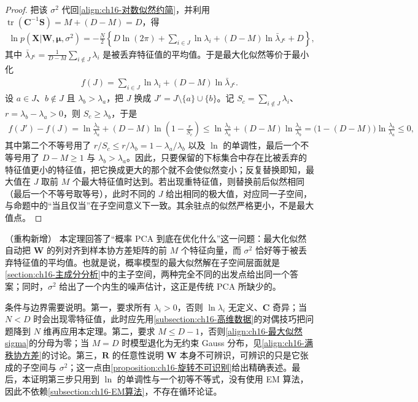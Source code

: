 \documentclass[../../main.tex]{subfiles}
\begin{document}
\begin{proof}
把该 $\sigma^2$ 代回\eqref{align:ch16-对数似然约简}，并利用 $\operatorname{tr}(\bm{C}^{-1}\bm{S})=M+(D-M)=D$，得
\begin{align*}
  \ln p(\bm{X}|\bm{W},\bm{\mu},\sigma^2)=-\frac{N}{2}\left\{D\ln(2\pi)+\sum_{i\in J}\ln\lambda_i+(D-M)\ln\bar{\lambda}_{J^{\mathsf c}}+D\right\},
\end{align*}
其中 $\bar{\lambda}_{J^{\mathsf c}}=\frac{1}{D-M}\sum_{i\notin J}\lambda_i$ 是被丢弃特征值的平均值。于是最大化似然等价于最小化
\begin{align*}
  f(J)=\sum_{i\in J}\ln\lambda_i+(D-M)\ln\bar{\lambda}_{J^{\mathsf c}}.
\end{align*}
设 $a\in J$、$b\notin J$ 且 $\lambda_b>\lambda_a$，把 $J$ 换成 $J'=J\setminus\{a\}\cup\{b\}$。记 $S_c=\sum_{i\notin J}\lambda_i$、$r=\lambda_b-\lambda_a>0$，则 $S_c\geqslant\lambda_b$，于是
\begin{align*}
  f(J')-f(J)=\ln\frac{\lambda_b}{\lambda_a}+(D-M)\ln\left(1-\frac{r}{S_c}\right)
  \leqslant\ln\frac{\lambda_b}{\lambda_a}+(D-M)\ln\frac{\lambda_a}{\lambda_b}
  =\bigl(1-(D-M)\bigr)\ln\frac{\lambda_b}{\lambda_a}\leqslant0,
\end{align*}
其中第二个不等号用了 $r/S_c\leqslant r/\lambda_b=1-\lambda_a/\lambda_b$ 以及 $\ln$ 的单调性，最后一个不等号用了 $D-M\geqslant1$ 与 $\lambda_b>\lambda_a$。因此，只要保留的下标集合中存在比被丢弃的特征值更小的特征值，把它换成更大的那个就不会使似然变小；反复替换即知，最大值在 $J$ 取前 $M$ 个最大特征值时达到。若出现重特征值，则替换前后似然相同（最后一个不等号取等号），此时不同的 $J$ 给出相同的极大值，对应同一子空间，与命题中的“当且仅当”在子空间意义下一致。其余驻点的似然严格更小，不是最大值点。
\end{proof}

\begin{remark}（重构新增）
本定理回答了“概率 PCA 到底在优化什么”这一问题：最大化似然自动把 $\bm{W}$ 的列对齐到样本协方差矩阵的前 $M$ 个特征向量，而 $\sigma^2$ 恰好等于被丢弃特征值的平均值。也就是说，概率模型的最大似然解在子空间层面就是\cref{section:ch16-主成分分析}中的主子空间，两种完全不同的出发点给出同一个答案；同时，$\sigma^2$ 给出了一个内生的噪声估计，这正是传统 PCA 所缺少的。

条件与边界需要说明。第一，要求所有 $\lambda_i>0$，否则 $\ln\lambda_i$ 无定义、$\bm{C}$ 奇异；当 $N<D$ 时会出现零特征值，此时应先用\cref{subsection:ch16-高维数据}的对偶技巧把问题降到 $N$ 维再应用本定理。第二，要求 $M\leqslant D-1$，否则\eqref{align:ch16-最大似然sigma}的分母为零；当 $M=D$ 时模型退化为无约束 Gauss 分布，见\eqref{align:ch16-满秩协方差}的讨论。第三，$\bm{R}$ 的任意性说明 $\bm{W}$ 本身不可辨识，可辨识的只是它张成的子空间与 $\sigma^2$；这一点由\cref{proposition:ch16-旋转不可识别}给出精确表述。最后，本证明第三步只用到 $\ln$ 的单调性与一个初等不等式，没有使用 EM 算法，因此不依赖\cref{subsection:ch16-EM算法}，不存在循环论证。
\end{remark}
\end{document}
